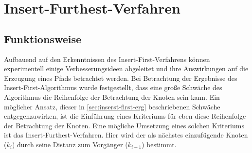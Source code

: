 \section{Insert-Furthest-Verfahren} \label{sec:insert-furthest-verfahren}
\subsection{Funktionsweise} \label{sec:insert-furthest-funkt}
Aufbauend auf den Erkenntnissen des Insert-First-Verfahrens können experimentell einige Verbesserungsideen abgeleitet und ihre Auswirkungen auf die Erzeugung eines Pfads betrachtet werden.
Bei Betrachtung der Ergebnisse des Insert-First-Algorithmus wurde festgestellt, dass eine große Schwäche des Algorithmus die Reihenfolge der Betrachtung der Knoten sein kann.
Ein möglicher Ansatz, dieser in \vref{sec:inserst-first-erg} beschriebenen Schwäche entgegenzuwirken, ist die Einführung eines Kriteriums für eben diese Reihenfolge der Betrachtung der Knoten.
Eine mögliche Umsetzung eines solchen Kriteriums ist das Insert-Furthest-Verfahren. 
Hier wird der als nächstes einzufügende Knoten ($k_i$) durch seine Distanz zum Vorgänger ($k_{i-1}$) bestimmt.



